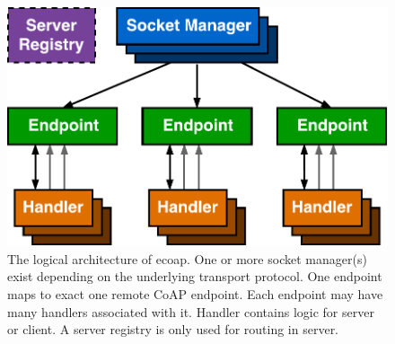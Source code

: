 \begin{figure}[!htbp]
\centering
\includegraphics[scale = 0.55]{ecoap_logic_arch}
\caption[The logical architecture of ecoap]{The logical architecture of ecoap. One or more socket manager(s) exist depending on the underlying transport protocol. One endpoint maps to exact one remote CoAP endpoint. Each endpoint may have many handlers associated with it. Handler contains logic for server or client. A server registry is only used for routing in server.}
\label{fig:ecoap_arch_logic}
\end{figure}

